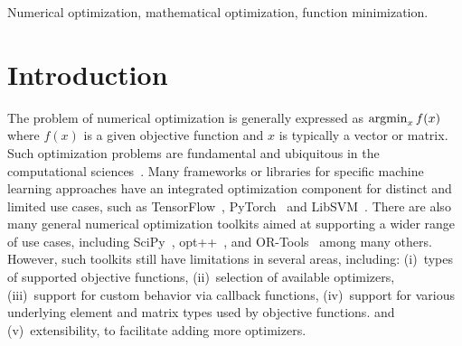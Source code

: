 \documentclass[twoside,11pt]{article}
\begin{document}
\begin{keywords}
  Numerical optimization, mathematical optimization, function minimization.
\end{keywords}


\section{Introduction}

The problem of numerical optimization is generally expressed as
$\operatornamewithlimits{argmin}_x f(x)$
where $f(x)$ is a given objective function and $x$ is typically a vector or matrix.
Such optimization problems are fundamental and ubiquitous in the computational sciences~\citep{Nocedal_2006}.
Many frameworks or libraries for specific machine learning approaches
have an integrated optimization component for distinct and limited use cases,
such as
TensorFlow~\citep{TensorFlow_arXiv_2016},
PyTorch~\citep{PyTorch_NeurIPS_2019}
and LibSVM~\citep{libsvm2011}.
There are also many general numerical optimization toolkits
aimed at supporting a wider range of use cases,
including SciPy~\citep{SciPy_arXiv_2019},
opt++~\citep{meza1994opt++},
and 
OR-Tools~\citep{ortools} among many others.
However, such toolkits still have limitations in several areas,
including:
(i)~types of supported objective functions,
(ii)~selection of available optimizers,
(iii)~support for custom behavior via callback functions,
(iv)~support for various underlying element and matrix types used by objective functions.
and
(v)~extensibility, to facilitate adding more optimizers.
\end{document}
